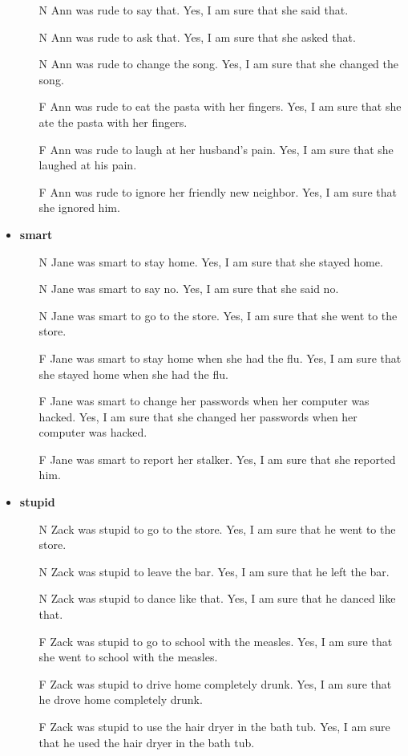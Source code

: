 \documentclass[11pt,fleqn]{article}
\newcommand{\6}{\mbox{$[\hspace*{-.6mm}[$}}
\newcommand{\9}{\mbox{$]\hspace*{-.6mm}]$}}
\begin{document}
\begin{itemize}[itemsep=-1pt]
\begin{enumerate}[topsep=0pt,itemsep=-4pt]
\item[N]  	Ann was rude to say that.	Yes, I am sure that she said that.
\item[N]  	Ann was rude to ask that.	Yes, I am sure that she asked that.
\item[N]  	Ann was rude to change the song.	Yes, I am sure that she changed the song.
\item[F]  	Ann was rude to eat the pasta with her fingers.	Yes, I am sure that she ate the pasta with her fingers.
\item[F]  	Ann was rude to laugh at her husband's pain.	Yes, I am sure that she laughed at his pain.
\item[F]  	Ann was rude to ignore her friendly new neighbor.	Yes, I am sure that she ignored him.

\end{enumerate}

\item {\bf smart}

\begin{enumerate}[topsep=0pt,itemsep=-4pt]

\item[N]  	Jane was smart to stay home.	Yes, I am sure that she stayed home.
\item[N]  	Jane was smart to say no.	Yes, I am sure that she said no.
\item[N]  	Jane was smart to go to the store.	Yes, I am sure that she went to the store.
\item[F]  	Jane was smart to stay home when she had the flu.	Yes, I am sure that she stayed home when she had the flu.
\item[F]  	Jane was smart to change her passwords when her computer was hacked.	Yes, I am sure that she changed her passwords when her computer was hacked.
\item[F]  	Jane was smart to report her stalker.	Yes, I am sure that she reported him.

\end{enumerate}

\item {\bf stupid}

\begin{enumerate}[topsep=0pt,itemsep=-4pt]

\item[N]  	Zack was stupid to go to the store.	Yes, I am sure that he went to the store.
\item[N]  	Zack was stupid to leave the bar.	Yes, I am sure that he left the bar.
\item[N]  	Zack was stupid to dance like that.	Yes, I am sure that he danced like that.
\item[F]  	Zack was stupid to go to school with the measles.	Yes, I am sure that she went to school with the measles.
\item[F]  	Zack was stupid to drive home completely drunk.	Yes, I am sure that he drove home completely drunk.
\item[F]  	Zack was stupid to use the hair dryer in the bath tub.	Yes, I am sure that he used the hair dryer in the bath tub.


\end{enumerate}
\end{itemize}
\end{document}
